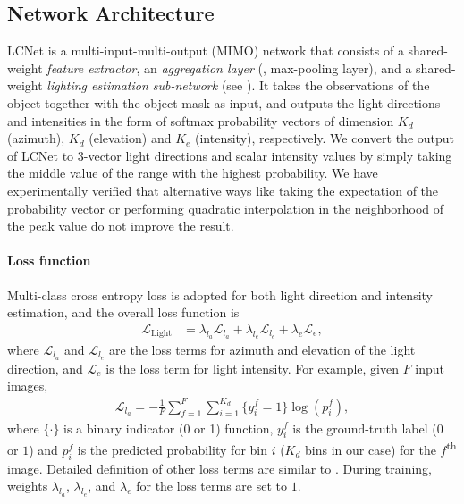 \subsection{Network Architecture}
LCNet is a multi-input-multi-output (MIMO) network that consists of a shared-weight \emph{feature extractor}, an \emph{aggregation layer} (\ie, max-pooling layer), and a shared-weight \emph{lighting estimation sub-network} (see ). 
It takes the observations of the object together with the object mask as input, and outputs the light directions and intensities in the form of softmax probability vectors of dimension $K_d$ (azimuth), $K_d$ (elevation) and $K_e$ (intensity), respectively. 
We convert the output of LCNet to $3$-vector light directions and scalar intensity values by simply taking the middle value of the range with the highest probability. We have experimentally verified that alternative ways like taking the expectation of the probability vector or performing quadratic interpolation in the neighborhood of the peak value do not improve the result.

\paragraph{Loss function}
Multi-class cross entropy loss is adopted for both light direction and intensity estimation, and the overall loss function is
\begin{align}
    \label{eq:cls_loss}
    \mathcal{L}_{\text{Light}} & = \lambda_{l_a} \mathcal{L}_{l_a} + \lambda_{l_e} \mathcal{L}_{l_e} + \lambda_e \mathcal{L}_e,
\end{align}
where $\mathcal{L}_{l_a}$ and $\mathcal{L}_{l_e}$ are the loss terms for azimuth and elevation of the light direction, and $\mathcal{L}_e$ is the loss term for light intensity. 
For example, given $F$ input images,
\begin{align}
    \label{eq:cls_detail_loss}
    \mathcal{L}_{l_a}=-\frac{1}{F} \sum_{f=1}^{F} \sum_{i=1}^{K_d} \{y_{i}^f=1\} \log(p_i^f),
\end{align}
where $\{\cdot\}$ is a binary indicator (0 or 1) function, $y_i^f$ is the ground-truth label ($0$ or $1$) and $p_i^f$ is the predicted probability for bin $i$ ($K_d$ bins in our case) for the $f$\textsuperscript{th} image. Detailed definition of other loss terms are similar to .
During training, weights $\lambda_{l_a}$, $\lambda_{l_e}$, and $\lambda_e$ for the loss terms are set to $1$.



